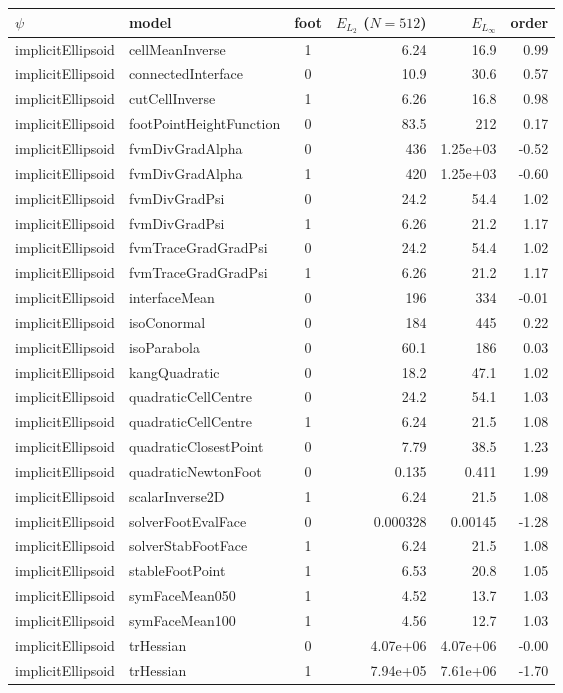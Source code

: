 \begin{tabular}{l l c r r r}
\hline
$\psi$ & model & foot & $E_{L_2}$ ($N{=}512$) & $E_{L_\infty}$ & order \\
\hline
implicitEllipsoid & cellMeanInverse & 1 & 6.24 & 16.9 & 0.99 \\
implicitEllipsoid & connectedInterface & 0 & 10.9 & 30.6 & 0.57 \\
implicitEllipsoid & cutCellInverse & 1 & 6.26 & 16.8 & 0.98 \\
implicitEllipsoid & footPointHeightFunction & 0 & 83.5 & 212 & 0.17 \\
implicitEllipsoid & fvmDivGradAlpha & 0 & 436 & 1.25e+03 & -0.52 \\
implicitEllipsoid & fvmDivGradAlpha & 1 & 420 & 1.25e+03 & -0.60 \\
implicitEllipsoid & fvmDivGradPsi & 0 & 24.2 & 54.4 & 1.02 \\
implicitEllipsoid & fvmDivGradPsi & 1 & 6.26 & 21.2 & 1.17 \\
implicitEllipsoid & fvmTraceGradGradPsi & 0 & 24.2 & 54.4 & 1.02 \\
implicitEllipsoid & fvmTraceGradGradPsi & 1 & 6.26 & 21.2 & 1.17 \\
implicitEllipsoid & interfaceMean & 0 & 196 & 334 & -0.01 \\
implicitEllipsoid & isoConormal & 0 & 184 & 445 & 0.22 \\
implicitEllipsoid & isoParabola & 0 & 60.1 & 186 & 0.03 \\
implicitEllipsoid & kangQuadratic & 0 & 18.2 & 47.1 & 1.02 \\
implicitEllipsoid & quadraticCellCentre & 0 & 24.2 & 54.1 & 1.03 \\
implicitEllipsoid & quadraticCellCentre & 1 & 6.24 & 21.5 & 1.08 \\
implicitEllipsoid & quadraticClosestPoint & 0 & 7.79 & 38.5 & 1.23 \\
implicitEllipsoid & quadraticNewtonFoot & 0 & 0.135 & 0.411 & 1.99 \\
implicitEllipsoid & scalarInverse2D & 1 & 6.24 & 21.5 & 1.08 \\
implicitEllipsoid & solverFootEvalFace & 0 & 0.000328 & 0.00145 & -1.28 \\
implicitEllipsoid & solverStabFootFace & 1 & 6.24 & 21.5 & 1.08 \\
implicitEllipsoid & stableFootPoint & 1 & 6.53 & 20.8 & 1.05 \\
implicitEllipsoid & symFaceMean050 & 1 & 4.52 & 13.7 & 1.03 \\
implicitEllipsoid & symFaceMean100 & 1 & 4.56 & 12.7 & 1.03 \\
implicitEllipsoid & trHessian & 0 & 4.07e+06 & 4.07e+06 & -0.00 \\
implicitEllipsoid & trHessian & 1 & 7.94e+05 & 7.61e+06 & -1.70 \\
\hline
\end{tabular}
